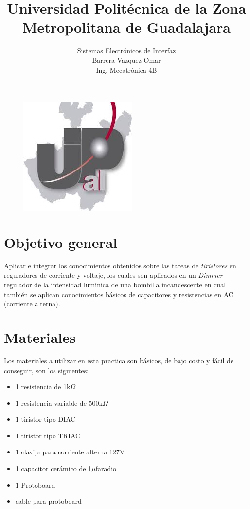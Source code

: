 \documentclass[11pt,a4paper]{article}
\title{Universidad Politécnica de la Zona Metropolitana de Guadalajara}
\begin{document}
\maketitle
\begin{figure}[h]
\begin{center}
\includegraphics[scale=1]{1.jpeg}
\end{center}
\end{figure}

\begin{center}
\author{Sistemas Electrónicos de Interfaz\\
Barrera Vazquez Omar\\
Ing. Mecatrónica 4B}
\end{center}

\newpage

\section{Objetivo general}

Aplicar e integrar los conocimientos obtenidos sobre las tareas de \emph{tiristores} en reguladores de corriente y voltaje, los cuales son aplicados en un \emph{Dimmer} regulador de la intensidad lumínica de una bombilla incandescente en cual también se aplican conocimientos básicos de capacitores y resistencias en AC (corriente alterna).

\section{Materiales}

Los materiales a utilizar en esta practica son básicos, de bajo costo y fácil de conseguir, son los siguientes:

\begin{itemize}

\item 1 resistencia de 1k$\Omega$
\item 1 resistencia variable de 500k$\Omega$
\item 1 tiristor tipo DIAC
\item 1 tiristor tipo TRIAC
\item 1 clavija para corriente alterna 127V
\item 1 capacitor cerámico de 1$\mu$faradio
\item 1 Protoboard
\item cable para protoboard 

\end{itemize}
\end{document}
